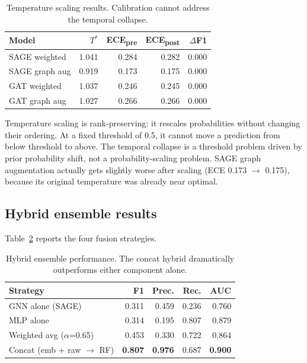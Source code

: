 \documentclass[11pt]{article}
\begin{document}
\begin{table}[t]
\centering
\small
\caption{Temperature scaling results.  Calibration cannot address the
temporal collapse.}
\label{tab:calibration}
\begin{tabular}{lrrrr}
\toprule
\textbf{Model} & \textbf{$T^*$}
  & \textbf{ECE\textsubscript{pre}}
  & \textbf{ECE\textsubscript{post}} & \textbf{$\Delta$F1} \\
\midrule
SAGE weighted  & 1.041 & 0.284 & 0.282 & 0.000 \\
SAGE graph aug & 0.919 & 0.173 & 0.175 & 0.000 \\
GAT weighted   & 1.037 & 0.246 & 0.245 & 0.000 \\
GAT graph aug  & 1.027 & 0.266 & 0.266 & 0.000 \\
\bottomrule
\end{tabular}
\end{table}

Temperature scaling is rank-preserving: it rescales probabilities
without changing their ordering.  At a fixed threshold of 0.5, it
cannot move a prediction from below threshold to above.  The temporal
collapse is a threshold problem driven by prior probability shift,
not a probability-scaling problem.  SAGE graph augmentation actually
gets slightly worse after scaling (ECE 0.173 $\to$ 0.175), because
its original temperature was already near optimal.

\subsection{Hybrid ensemble results}

Table~\ref{tab:hybrid} reports the four fusion strategies.

\begin{table}[t]
\centering
\small
\caption{Hybrid ensemble performance.  The concat hybrid dramatically
outperforms either component alone.}
\label{tab:hybrid}
\begin{tabular}{lrrrr}
\toprule
\textbf{Strategy} & \textbf{F1} & \textbf{Prec.} & \textbf{Rec.}
  & \textbf{AUC} \\
\midrule
GNN alone (SAGE) & 0.311 & 0.459 & 0.236 & 0.760 \\
MLP alone & 0.314 & 0.195 & 0.807 & 0.879 \\
Weighted avg ($\alpha$=0.65) & 0.453 & 0.330 & 0.722 & 0.864 \\
Concat (emb + raw $\to$ RF) & \textbf{0.807} & \textbf{0.976}
  & 0.687 & \textbf{0.900} \\
\bottomrule
\end{tabular}
\end{table}
\end{document}
